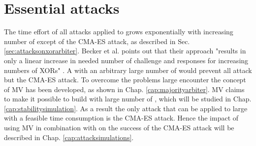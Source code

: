 
\section{Essential attacks}
\label{sec:essentialattacks}

The time effort of all attacks applied to \xpufs grows exponentially with increasing number of \apuf except of the \ac{CMA-ES} attack, as described in Sec. \ref{sec:attacksonxorarbiter}.
Becker et al. points out that their approach "results in only a linear increase in needed number of challenge and responses for increasing numbers of XORs" \cite{Becker2015ThePUFs}.
A \xpuf with an arbitrary large number of \apufs would prevent all attack but the \ac{CMA-ES} attack.
To overcome the problems large \xpufs encounter the concept of \ac{MV} has been developed, as shown in Chap. \ref{cap:majorityarbiter}.
\ac{MV} claims to make it possible to build \xpufs with large number of \apufs, which will be studied in Chap. \ref{cap:stabilitysimulation}.
As a result the only attack that can be applied to large \xpufs with a feasible time consumption is the \ac{CMA-ES} attack.
Hence the impact of using \ac{MV} in combination with \apufs on the success of the \ac{CMA-ES} attack will be described in Chap. \ref{cap:attacksimulations}.

